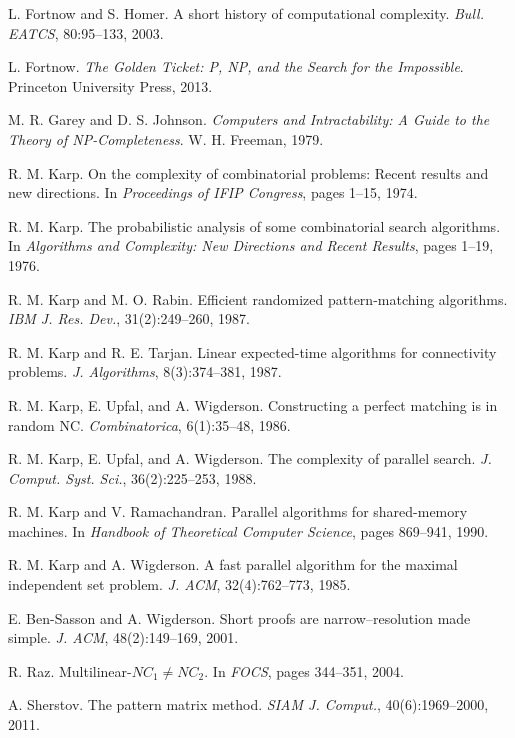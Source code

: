 \documentclass[11pt]{article}
\theoremstyle{plain}
\theoremstyle{definition}
\begin{document}
\begin{thebibliography}{99}
 L. Fortnow and S. Homer. A short history of computational complexity. \emph{Bull. EATCS}, 80:95--133, 2003.

 L. Fortnow. \emph{The Golden Ticket: P, NP, and the Search for the Impossible}. Princeton University Press, 2013.

 M. R. Garey and D. S. Johnson. \emph{Computers and Intractability: A Guide to the Theory of NP-Completeness}. W. H. Freeman, 1979.

 R. M. Karp. On the complexity of combinatorial problems: Recent results and new directions. In \emph{Proceedings of IFIP Congress}, pages 1--15, 1974.

 R. M. Karp. The probabilistic analysis of some combinatorial search algorithms. In \emph{Algorithms and Complexity: New Directions and Recent Results}, pages 1--19, 1976.

 R. M. Karp and M. O. Rabin. Efficient randomized pattern-matching algorithms. \emph{IBM J. Res. Dev.}, 31(2):249--260, 1987.

 R. M. Karp and R. E. Tarjan. Linear expected-time algorithms for connectivity problems. \emph{J. Algorithms}, 8(3):374--381, 1987.

 R. M. Karp, E. Upfal, and A. Wigderson. Constructing a perfect matching is in random NC. \emph{Combinatorica}, 6(1):35--48, 1986.

 R. M. Karp, E. Upfal, and A. Wigderson. The complexity of parallel search. \emph{J. Comput. Syst. Sci.}, 36(2):225--253, 1988.

 R. M. Karp and V. Ramachandran. Parallel algorithms for shared-memory machines. In \emph{Handbook of Theoretical Computer Science}, pages 869--941, 1990.

 R. M. Karp and A. Wigderson. A fast parallel algorithm for the maximal independent set problem. \emph{J. ACM}, 32(4):762--773, 1985.

 E. Ben-Sasson and A. Wigderson. Short proofs are narrow--resolution made simple. \emph{J. ACM}, 48(2):149--169, 2001.

 R. Raz. Multilinear-$NC_1 \neq NC_2$. In \emph{FOCS}, pages 344--351, 2004.

 A. Sherstov. The pattern matrix method. \emph{SIAM J. Comput.}, 40(6):1969--2000, 2011.

\end{thebibliography}
\end{document}
